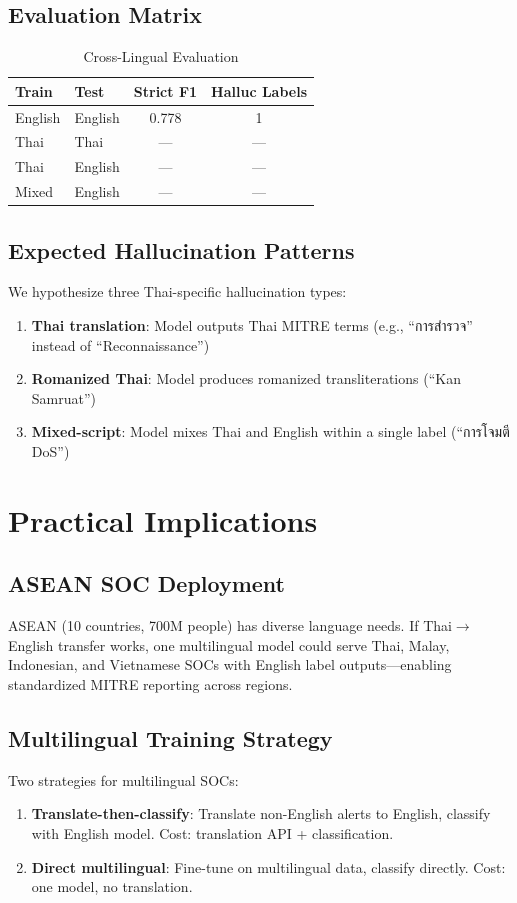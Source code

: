 \documentclass[journal]{IEEEtran}
\begin{document}
\subsection{Evaluation Matrix}
\begin{table}[!ht]
\centering\caption{Cross-Lingual Evaluation}
\begin{tabular}{llcc}
\toprule \textbf{Train} & \textbf{Test} & \textbf{Strict F1} & \textbf{Halluc Labels} \\
\midrule
English & English & 0.778 & 1 \\
Thai & Thai & --- & --- \\
Thai & English & --- & --- \\
Mixed & English & --- & --- \\
\bottomrule
\end{tabular}
\end{table}

\subsection{Expected Hallucination Patterns}
We hypothesize three Thai-specific hallucination types:
\begin{enumerate}
\item \textbf{Thai translation}: Model outputs Thai MITRE terms (e.g., ``\textthai{การสำรวจ}'' instead of ``Reconnaissance'')
\item \textbf{Romanized Thai}: Model produces romanized transliterations (``Kan Samruat'')
\item \textbf{Mixed-script}: Model mixes Thai and English within a single label (``การโจมตี DoS'')
\end{enumerate}

\section{Practical Implications}

\subsection{ASEAN SOC Deployment}
ASEAN (10 countries, 700M people) has diverse language needs. If Thai$\to$English transfer works, one multilingual model could serve Thai, Malay, Indonesian, and Vietnamese SOCs with English label outputs---enabling standardized MITRE reporting across regions.

\subsection{Multilingual Training Strategy}
Two strategies for multilingual SOCs:
\begin{enumerate}
\item \textbf{Translate-then-classify}: Translate non-English alerts to English, classify with English model. Cost: translation API + classification.
\item \textbf{Direct multilingual}: Fine-tune on multilingual data, classify directly. Cost: one model, no translation.
\end{enumerate}
\end{document}
